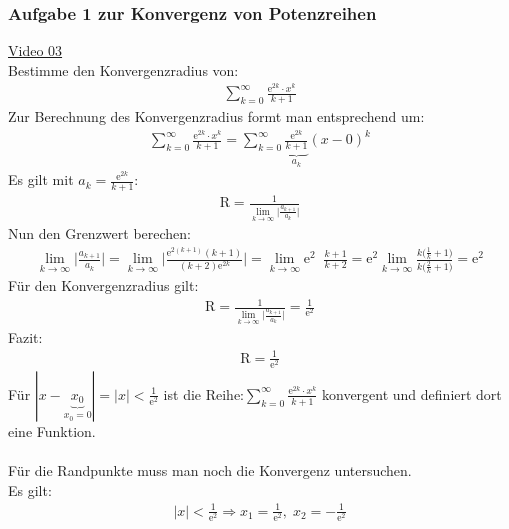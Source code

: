 \subsubsection{ Aufgabe 1 zur Konvergenz von Potenzreihen}
\href{https://youtu.be/PZkcdZNx7I4}{Video 03}\\
Bestimme den Konvergenzradius von:\\
\begin{align*}
	\sum\limits_{k=0}^{\infty}\frac{\mathrm{e}^{2k}\cdot x^k}{k+1}
\end{align*}
Zur Berechnung des Konvergenzradius formt man entsprechend um:\\
\begin{align*}
	\sum\limits_{k=0}^{\infty}\frac{\mathrm{e}^{2k}\cdot x^k}{k+1}=\sum\limits_{k=0}^{\infty}\underbrace {\frac{\mathrm{e}^{2k}}{k+1}}_{a_k}(x-0)^k
\end{align*}
Es gilt mit $ a_k=\frac{\mathrm{e}^{2k}}{k+1} $:\\
\begin{align*}
	\mathrm{R}=\frac{1}{\lim\limits_ {k\to\infty}\big|\frac{a_{k+1}}{a_k}\big|}
\end{align*}
Nun den Grenzwert berechen:\\
\begin{align*}
	\lim\limits_ {k\to\infty}\bigg|\frac{a_{k+1}}{a_k}\bigg|=\lim\limits_ {k\to\infty}\bigg|\frac{\mathrm{e}^{2(k+1)}(k+1)}{(k+2)\mathrm{e}^{2k}}\bigg|=\lim\limits_ {k\to\infty}\mathrm{e}^2\;\;\frac{k+1}{k+2}=\mathrm{e}^2\lim\limits_ {k\to\infty}\frac{k\big(\frac{1}{k}+1\big)}{k\big(\frac{2}{k}+1\big)}=\mathrm{e}^2
\end{align*}
Für den Konvergenzradius gilt:\\
\begin{align*}
	\mathrm{R}=\frac{1}{\lim\limits_ {k\to\infty}\big|\frac{a_{k+1}}{a_k}\big|}=\frac{1}{\mathrm{e}^2}
\end{align*}
Fazit:\\
\begin{align*}
	\mathrm{R}=\frac{1}{\mathrm{e}^2}
\end{align*}
Für $ |x-\underbrace {x_0}_{x_0=0}|=|x|<\frac{1}{\mathrm{e}^2} $ ist die Reihe:$\sum\limits_{k=0}^{\infty}\frac{\mathrm{e}^{2k}\cdot x^k}{k+1}  $ konvergent und definiert dort eine Funktion.\\
\\
Für die Randpunkte muss man noch die Konvergenz untersuchen.\\
Es gilt:\\
\begin{align*}
	|x|<\frac{1}{\mathrm{e}^2}\Rightarrow x_1=\frac{1}{\mathrm{e}^2},\; x_2=-\frac{1}{\mathrm{e}^2}
\end{align*}
